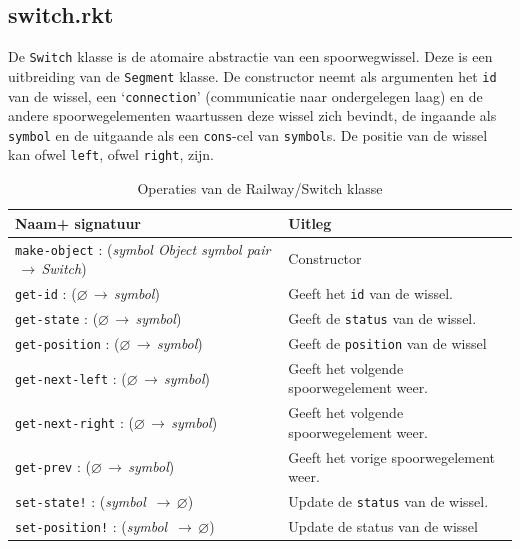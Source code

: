 \documentclass[a4paper, 11pt]{article}
\newcommand{\naar}{\,$\rightarrow$\,}
\renewcommand{\empty}{$\varnothing$}
\newcommand{\<}{\scriptsize\textless\normalsize}
\renewcommand{\>}{\scriptsize\textgreater\normalsize}
\begin{document}
\subsection{switch.rkt} %
De \texttt{Switch} klasse is de atomaire abstractie van een spoorwegwissel. Deze is een uitbreiding van de \texttt{Segment} klasse. De constructor neemt als argumenten het \texttt{id} van de wissel, een \lq\texttt{connection}' (communicatie naar ondergelegen laag) en de andere spoorwegelementen waartussen deze wissel zich bevindt, de ingaande als \texttt{symbol} en de uitgaande als een \texttt{cons}-cel van \texttt{symbol}s. De positie van de wissel kan ofwel \texttt{left}, ofwel \texttt{right}, zijn.
\begin{table}[H]
	\begin{center}
		{
		\begin{tabular}{|l l|}
			\hline
			\textbf{Naam+ signatuur} & \textbf{Uitleg}\\
			\hline
			\texttt{make-object} : (\textit{symbol Object symbol pair} \naar \textit{Switch}) & Constructor\\
			\hline
			\texttt{get-id} : (\empty \naar \textit{symbol}) & Geeft het \texttt{id} van de wissel.\\
			\texttt{get-state} : (\empty \naar \textit{symbol}) & Geeft de \texttt{status} van de wissel.\\
			\texttt{get-position} : (\empty \naar \textit{symbol}) & Geeft de \texttt{position} van de wissel\\
			\texttt{get-next-left} : (\empty \naar \textit{symbol}) & Geeft het volgende spoorwegelement weer.\\
			\texttt{get-next-right} : (\empty \naar \textit{symbol}) & Geeft het volgende spoorwegelement weer.\\
			\texttt{get-prev} : (\empty \naar \textit{symbol}) & Geeft het vorige spoorwegelement weer.\\
			\texttt{set-state!} : (\textit{symbol} \naar \empty) & Update de \texttt{status} van de wissel.\\
			\texttt{set-position!} : (\textit{symbol} \naar \empty) & Update de status van de wissel\\
			\hline
		\end{tabular}}
		\caption{Operaties van de Railway/Switch klasse}
	\end{center}
\end{table}
\end{document}
